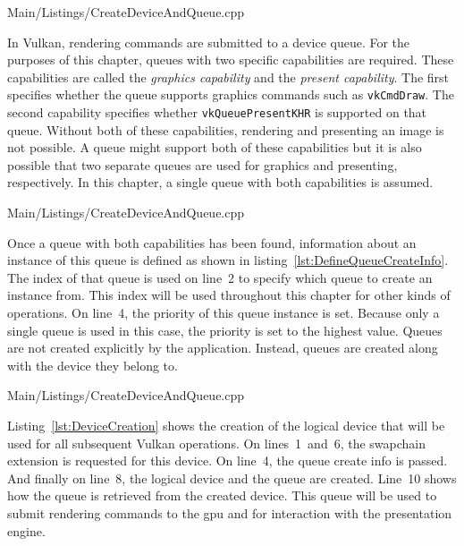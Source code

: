       
      {Main/Listings/CreateDeviceAndQueue.cpp}

      In Vulkan, rendering commands are submitted to a device queue.
      For the purposes of this chapter, queues with two specific capabilities are required.
      These capabilities are called the \textit{graphics capability} and the \textit{present capability}.
      The first specifies whether the queue supports graphics commands such as \lstinline{vkCmdDraw}.
      The second capability specifies whether \lstinline{vkQueuePresentKHR} is supported on that queue.
      Without both of these capabilities, rendering and presenting an image is not possible.
      A queue might support both of these capabilities but it is also possible that two separate queues are used for graphics and presenting, respectively.
      In this chapter, a single queue with both capabilities is assumed.

      
      {Main/Listings/CreateDeviceAndQueue.cpp}

      Once a queue with both capabilities has been found, information about an instance of this queue is defined as shown in listing~\ref{lst:DefineQueueCreateInfo}.
      The index of that queue is used on line~2 to specify which queue to create an instance from.
      This index will be used throughout this chapter for other kinds of operations.
      On line~4, the priority of this queue instance is set.
      Because only a single queue is used in this case, the priority is set to the highest value.
      Queues are not created explicitly by the application.
      Instead, queues are created along with the device they belong to.

      
      {Main/Listings/CreateDeviceAndQueue.cpp}

      Listing~\ref{lst:DeviceCreation} shows the creation of the logical device that will be used for all subsequent Vulkan operations.
      On lines~1~and~6, the swapchain extension is requested for this device.
      On line~4, the queue create info is passed.
      And finally on line~8, the logical device and the queue are created.
      Line~10 shows how the queue is retrieved from the created device.
      This queue will be used to submit rendering commands to the \gls{gpu} and for interaction with the presentation engine.

